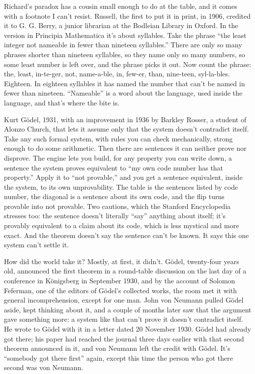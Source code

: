 \documentclass[11pt,twoside]{article}
\theoremstyle{thielethm}
\theoremstyle{thieledef}
\theoremstyle{thieledef}
\theoremstyle{thieledef}
\theoremstyle{thielethm}
\theoremstyle{thieleobs}
\theoremstyle{thielethm}
\begin{document}
Richard's paradox has a cousin small enough to do at the table, and it comes with a footnote I can't resist. Russell, the first to put it in print, in 1906, credited it to G. G. Berry, a junior librarian at the Bodleian Library in Oxford. In the version in Principia Mathematica it's about syllables. Take the phrase ``the least integer not nameable in fewer than nineteen syllables.'' There are only so many phrases shorter than nineteen syllables, so they name only so many numbers, so some least number is left over, and the phrase picks it out. Now count the phrase: the, least, in-te-ger, not, name-a-ble, in, few-er, than, nine-teen, syl-la-bles. Eighteen. In eighteen syllables it has named the number that can't be named in fewer than nineteen. ``Nameable'' is a word about the language, used inside the language, and that's where the bite is.

Kurt Gödel, 1931, with an improvement in 1936 by Barkley Rosser, a student of Alonzo Church, that lets it assume only that the system doesn't contradict itself. Take any such formal system, with rules you can check mechanically, strong enough to do some arithmetic. Then there are sentences it can neither prove nor disprove. The engine lets you build, for any property you can write down, a sentence the system proves equivalent to ``my own code number has that property.'' Apply it to ``not provable,'' and you get a sentence equivalent, inside the system, to its own unprovability. The table is the sentences listed by code number, the diagonal is a sentence about its own code, and the flip turns provable into not provable. Two cautions, which the Stanford Encyclopedia stresses too: the sentence doesn't literally ``say'' anything about itself; it's provably equivalent to a claim about its code, which is less mystical and more exact. And the theorem doesn't say the sentence can't be known. It says this one system can't settle it.

How did the world take it? Mostly, at first, it didn't. Gödel, twenty-four years old, announced the first theorem in a round-table discussion on the last day of a conference in Königsberg in September 1930, and by the account of Solomon Feferman, one of the editors of Gödel's collected works, the room met it with general incomprehension, except for one man. John von Neumann pulled Gödel aside, kept thinking about it, and a couple of months later saw that the argument gave something more: a system like that can't prove it doesn't contradict itself. He wrote to Gödel with it in a letter dated 20 November 1930. Gödel had already got there; his paper had reached the journal three days earlier with that second theorem announced in it, and von Neumann left the credit with Gödel. It's ``somebody got there first'' again, except this time the person who got there second was von Neumann.
\end{document}
